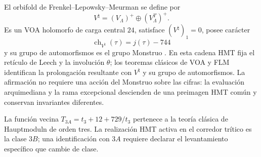 El orbifold de Frenkel--Lepowsky--Meurman se define por
\[
 V^\natural=(V_\Lambda)^+\oplus(V_\Lambda^T)^+.
\]
Es un VOA holomorfo de carga central \(24\), satisface
\((V^\natural)_1=0\), posee carácter
\[
 \operatorname{ch}_{V^\natural}(\tau)=j(\tau)-744
\]
y su grupo de automorfismos es el grupo Monstruo
\cite{FLM1988,ConwayNorton1979,Borcherds1992}. En esta cadena HMT fija el
retículo de Leech y la involución \(\theta\); los teoremas clásicos de VOA y
FLM identifican la prolongación resultante con \(V^\natural\) y su grupo de
automorfismos. La afirmación no requiere una acción del Monstruo sobre las
cifras: la evaluación arquimediana y la rama excepcional descienden de una
preimagen HMT común y conservan invariantes diferentes.

La función vecina
\(T_{3A}=t_3+12+729/t_3\) pertenece a la teoría clásica de Hauptmoduln de
orden tres. La realización HMT activa en el corredor trítico es la clase
\(3B\); una identificación con \(3A\) requiere declarar el levantamiento específico
que cambie de clase.
